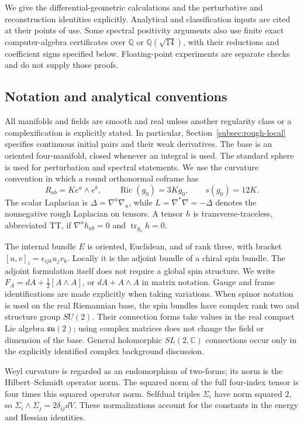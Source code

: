 \documentclass[11pt]{article}
\numberwithin{equation}{section}
\theoremstyle{definition}
\theoremstyle{remark}
\begin{document}
We give the differential-geometric calculations and the perturbative and
reconstruction identities explicitly. Analytical and classification inputs
are cited at their points of use. Some spectral positivity arguments also
use finite exact computer-algebra certificates over $\mathbb Q$ or
$\mathbb Q(\sqrt{14})$, with their reductions and coefficient signs
specified below. Floating-point experiments are separate checks and do
not supply those proofs.

\subsection{Notation and analytical conventions}\label{sec:notation}
All manifolds and fields are smooth and real unless another regularity class or a complexification is explicitly stated. In particular, Section~\ref{subsec:rough-local} specifies continuous initial pairs and their weak derivatives. The base is an oriented four-manifold, closed whenever an integral is used. The standard sphere is used for perturbation and spectral statements. We use the curvature convention in which a round orthonormal coframe has
\[
R_{ab}=K e^a\wedge e^b,\qquad
\operatorname{Ric}(g_0)=3Kg_0,\qquad s(g_0)=12K.
\]
The scalar Laplacian is \(\Delta=\nabla^a\nabla_a\), while \(L=\nabla^*\nabla=-\Delta\) denotes the nonnegative rough Laplacian on tensors. A tensor \(h\) is transverse-traceless, abbreviated TT, if
\(\nabla^a h_{ab}=0\) and \(\operatorname{tr}_{g_0}h=0\).

The internal bundle \(E\) is oriented, Euclidean, and of rank three, with bracket
\([u,v]_i=\epsilon_{ijk}u_jv_k\). Locally it is the adjoint bundle of a chiral spin bundle. The adjoint formulation itself does not require a global spin structure. We write \(F_A=dA+\tfrac12[A\wedge A]\), or \(dA+A\wedge A\) in matrix notation. Gauge and frame identifications are made explicitly when taking variations.
When spinor notation is used on the real Riemannian base, the spin bundles
have complex rank two and structure group \(SU(2)\). Their connection
forms take values in the real compact Lie algebra \(\mathfrak{su}(2)\);
using complex matrices does not change the field or dimension of the base.
General holomorphic \(SL(2,\mathbb C)\) connections occur only in the
explicitly identified complex background discussion.

Weyl curvature is regarded as an endomorphism of two-forms; its norm is the Hilbert--Schmidt operator norm. The squared norm of the full four-index tensor is four times this squared operator norm. Selfdual triples \(\Sigma_i\) have norm squared \(2\), so
\(\Sigma_i\wedge\Sigma_j=2\delta_{ij}dV\). These normalizations account for the constants in the energy and Hessian identities.
\end{document}
